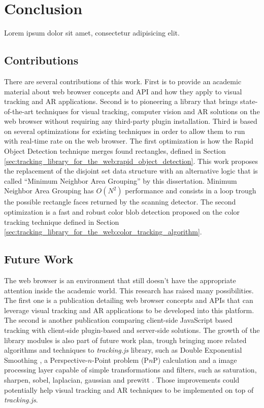 \chapter{Conclusion} %
\label{cha:conclusion}

Lorem ipsum dolor sit amet, consectetur adipisicing elit.

\section{Contributions} %
\label{sec:conclusion:contributions}

There are several contributions of this work. First is to provide an academic material about web browser concepts and API and how they apply to visual tracking and AR applications. Second is to pioneering a library that brings state-of-the-art techniques for visual tracking, computer vision and AR solutions on the web browser without requiring any third-party plugin installation. Third is based on several optimizations for existing techniques in order to allow them to run with real-time rate on the web browser. The first optimization is how the Rapid Object Detection technique   merges found rectangles, defined in Section \ref{sec:tracking_library_for_the_web:rapid_object_detection}. This work proposes the replacement of the disjoint set data structure with an alternative logic that is called ``Minimum Neighbor Area Grouping'' by this dissertation. Minimum Neighbor Area Grouping has $O(N^2)$ performance \cite{black2007big} and consists in a loop trough the possible rectangle faces returned by the scanning detector. The second optimization is a fast and robust color blob detection proposed on the color tracking technique defined in Section \ref{sec:tracking_library_for_the_web:color_tracking_algorithm}.


\section{Future Work} %
\label{sec:conclusion:future_work}

The web browser is an environment that still doesn't have the appropriate attention inside the academic world. This research has raised many possibilities. The first one is a publication detailing web browser concepts and APIs that can leverage visual tracking and AR applications to be developed into this platform. The second is another publication comparing client-side JavaScript based tracking with client-side plugin-based and server-side solutions. The growth of the library modules is also part of future work plan, trough bringing more related algorithms and techniques to \textit{tracking.js} library, such as Double Exponential Smoothing \cite{LaViola2003}, a Perspective-$n$-Point problem (P$n$P) calculation and a image processing layer capable of simple transformations and filters, such as saturation, sharpen, sobel, laplacian, gaussian and prewitt \cite{Gonzalez2007}. Those improvements could potentially help visual tracking and AR techniques to be implemented on top of \textit{tracking.js}.


